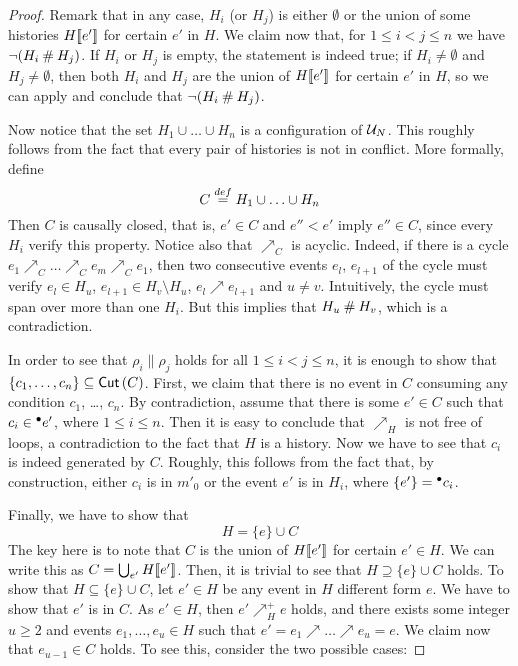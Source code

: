 \documentclass[12pt,a4paper]{article}
\newcommand{\confl}{\ensuremath\mathbin\#}
\begin{document}
\begin{proof}
Remark that in any case, $H_i$ (or $H_j$) is either $\emptyset$ or the union of
some histories $H[\![ e']\!]$ for certain $e'$ in $H$.  We claim now that, for $1
\le i < j \le n$ we have $\lnot (H_i \confl H_j)$.  If $H_i$ or $H_j$ is empty,
the statement is indeed true;  if $H_i \ne \emptyset$ and $H_j \ne \emptyset$,
then both $H_i$ and $H_j$ are the union of $H[\![ e']\!]$ for certain $e'$ in $H$,
so we can apply  and conclude that $\lnot (H_i \confl H_j)$.

Now notice that the set $H_1 \cup \ldots \cup H_n$ is a configuration of $\mathcal{U}_{N}$.  This roughly follows from the fact that every pair of histories is not in
conflict.  More formally, define $$C \stackrel{def}{=} H_1 \cup \ldots \cup H_n$$ Then
$C$ is causally closed, that is, $e' \in C$ and $e'' < e'$ imply $e'' \in C$,
since every $H_i$ verify this property.  Notice also that $\nearrow_C$ is
acyclic.  Indeed, if there is a cycle $e_1 \nearrow_C \ldots \nearrow_C e_m
\nearrow_C e_1$, then two consecutive events $e_l$, $e_{l+1}$ of the cycle must
verify $e_l \in H_u$, $e_{l+1} \in H_v \setminus H_u$, $e_l \nearrow e_{l+1}$
and $u \ne v$.  Intuitively, the cycle must span over more than one $H_i$.  But
this implies that $H_u \confl H_v$, which is a contradiction.

In order to see that $\rho_i \parallel \rho_j$ holds for all $1 \le i < j \le
n$, it is enough to show that $\{c_1, \ldots, c_n\} \subseteq \mathop{\mathsf{Cut}}{(C)}$.  First,
we claim that there is no event in $C$ consuming any condition $c_1$, \ldots,
$c_n$.  By contradiction, assume that there is some $e' \in C$ such that $c_i
\in {}^\bullet e'$, where $1 \le i \le n$.  Then it is easy to conclude that
$\nearrow_H$ is not free of loops, a contradiction to the fact that $H$ is a
history.  Now we have to see that $c_i$ is indeed generated by $C$.  Roughly,
this follows from the fact that, by construction, either $c_i$ is in $m'_0$ or
the event $e'$ is in $H_i$, where $\{e'\} = {}^\bullet c_i$.

Finally, we have to show that $$H = \{e\} \cup C$$  The key here is to note
that $C$ is the union of $H[\![ e']\!]$ for certain $e' \in H$.  We can write this
as $C = \bigcup_{e'} H[\![ e']\!]$.  Then, it is trivial to see that $H \supseteq
\{e\} \cup C$ holds.  To show that $H \subseteq \{e\} \cup C$, let $e' \in H$
be any event in $H$ different form $e$.  We have to show that $e'$ is in $C$.
As $e' \in H$, then $e' \nearrow^+_H e$ holds, and there exists some integer $u
\ge 2$ and events $e_1, \ldots, e_u \in H$ such that $e' = e_1 \nearrow \ldots
\nearrow e_u = e$.  We claim now that $e_{u-1} \in C$ holds.  To see this,
consider the two possible cases:


\end{proof}
\end{document}
